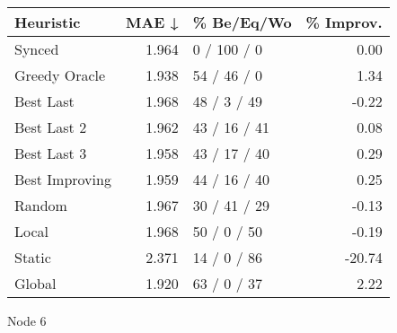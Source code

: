 \begin{tabular}{lrlr}
\toprule
\textbf{Heuristic} & \textbf{MAE ↓} & \textbf{\% Be/Eq/Wo} & \textbf{\% Improv.} \\
\midrule
            Synced &          1.964 &          0 / 100 / 0 &                0.00 \\
     Greedy Oracle &          1.938 &          54 / 46 / 0 &                1.34 \\
         Best Last &          1.968 &          48 / 3 / 49 &               -0.22 \\
       Best Last 2 &          1.962 &         43 / 16 / 41 &                0.08 \\
       Best Last 3 &          1.958 &         43 / 17 / 40 &                0.29 \\
    Best Improving &          1.959 &         44 / 16 / 40 &                0.25 \\
            Random &          1.967 &         30 / 41 / 29 &               -0.13 \\
             Local &          1.968 &          50 / 0 / 50 &               -0.19 \\
            Static &          2.371 &          14 / 0 / 86 &              -20.74 \\
            Global &          1.920 &          63 / 0 / 37 &                2.22 \\
\bottomrule
\end{tabular}
\caption{Node 6}
\label{tab:hr_non_lr01_le1_bs4_6}
